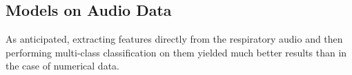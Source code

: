 \documentclass[10pt,twocolumn,letterpaper]{article}
\begin{document}

\subsection*{Models on Audio Data}
As anticipated, extracting features directly from the respiratory audio and then performing multi-class classification on them yielded much better results than in the case of numerical data.
\end{document}
